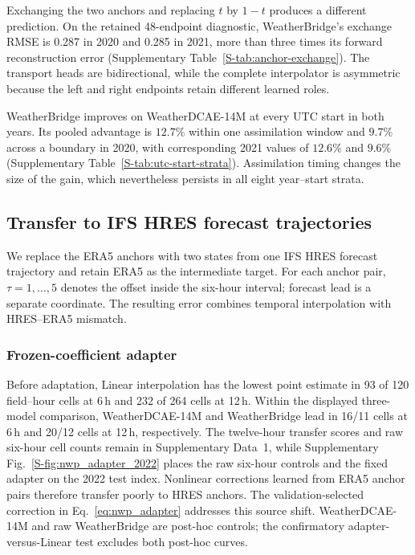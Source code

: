 \documentclass[referee,lineno,pdflatex,sn-nature]{sn-jnl}
\begin{document}
Exchanging the two anchors and replacing $t$ by $1-t$ produces a different
prediction. On the retained 48-endpoint diagnostic, WeatherBridge's
exchange RMSE is 0.287 in 2020 and 0.285 in 2021, more than three times its
forward reconstruction error (Supplementary Table~\ref{S-tab:anchor-exchange}).
The transport heads are bidirectional, while the complete interpolator is
asymmetric because the left and right endpoints retain different learned roles.

WeatherBridge improves on WeatherDCAE-14M at every UTC start in both years.
Its pooled advantage is $12.7\%$ within one assimilation window and $9.7\%$
across a boundary in 2020, with corresponding 2021 values of $12.6\%$ and
$9.6\%$ (Supplementary Table~\ref{S-tab:utc-start-strata}). Assimilation
timing changes the size of the gain, which nevertheless persists in all eight
year--start strata.

\subsection{Transfer to IFS HRES forecast trajectories}
\label{sec:hres_trajectories}

We replace the ERA5 anchors with two states from one IFS HRES forecast
trajectory and retain ERA5 as the intermediate target. For each anchor pair,
$\tau=1,\ldots,5$ denotes the offset inside the six-hour interval; forecast
lead is a separate coordinate. The resulting error combines temporal
interpolation with HRES--ERA5 mismatch.


\subsubsection{Frozen-coefficient adapter}

Before adaptation, Linear interpolation
has the lowest point estimate in 93 of 120 field--hour cells at 6\,h and 232
of 264 cells at 12\,h. Within the displayed three-model comparison,
WeatherDCAE-14M and WeatherBridge lead in 16/11 cells at 6\,h and 20/12 cells
at 12\,h, respectively.
The twelve-hour transfer scores and raw six-hour cell counts remain in
Supplementary Data~1, while Supplementary
Fig.~\ref{S-fig:nwp_adapter_2022} places the raw six-hour controls and the
fixed adapter on the 2022 test index. Nonlinear corrections learned
from ERA5 anchor pairs therefore transfer poorly to HRES anchors. The
validation-selected correction in Eq.~\ref{eq:nwp_adapter} addresses this
source shift. WeatherDCAE-14M and raw WeatherBridge are post-hoc controls; the
confirmatory adapter-versus-Linear test excludes both post-hoc curves.
\end{document}
